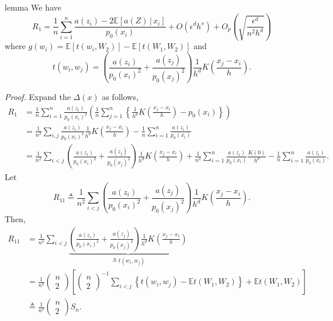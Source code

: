 \documentclass[11pt]{article}
\begin{document}
\begin{restatable}{lemma}{} \label{lemma: remainder term}
    We have
    \[R_1 = \frac{1}{n}\sum_{i = 1}^n \frac{a(z_i) - 2\mathbb{E}[a(Z)\,|\,x_i]}{p_0(x_i)} + O(\epsilon^dh^s) + O_p\left( \sqrt{\frac{\epsilon^d}{n^2h^d}}\right) \]
    where $g(w_i) = \mathbb{E}[t(w_i, W_2)] - \mathbb{E}[t(W_1, W_2)]$ and 
    \[t(w_i, w_j) = \left(\frac{a(z_i)}{p_0(x_i)^2} + \frac{a(z_j)}{p_0(x_j)^2}\right)\frac{1}{h^d}K\left(\frac{x_j - x_i}{h}\right).\]
\end{restatable}
\noindent \textit{Proof.} Expand the $\Delta(x)$ as follows,
\begin{align*}
    R_1&= \frac{1}{n}\sum_{i = 1}^n \frac{a(z_i)}{p_0(x_i)^2}\left(\frac{1}{n}\sum_{j = 1}^n\left\{\frac{1}{h^d}K\left(\frac{x_j - x_i}{h}\right) - p_0(x_i)\right\}\right) \\
    &= \frac{1}{n^2}\sum_{i, j} \frac{a(z_i)}{p_0(x_i)^2} \frac{1}{h^d}K\left(\frac{x_j - x_i}{h}\right) - \frac{1}{n}\sum_{i = 1}^n \frac{a(z_i)}{p_0(x_i)} \\
    &= \frac{1}{n^2} \sum_{i < j} \left(\frac{a(z_i)}{p_0(x_i)^2} + \frac{a(z_j)}{p_0(x_j)^2}\right)\frac{1}{h^d}K\left(\frac{x_j - x_i}{h}\right) + \frac{1}{n^2}\sum_{i = 1}^n\frac{a(z_i)}{p_0(x_i)}\frac{K(0)}{h^d} - \frac{1}{n}\sum_{i = 1}^n \frac{a(z_i)}{p_0(x_i)}.
\end{align*}
Let 
\[R_{11} \triangleq \frac{1}{n^2} \sum_{i < j} \left(\frac{a(z_i)}{p_0(x_i)^2} + \frac{a(z_j)}{p_0(x_j)^2}\right)\frac{1}{h^d}K\left(\frac{x_j - x_i}{h}\right).\]
Then, 
\begin{align*}
    R_{11} &= \frac{1}{n^2} \sum_{i < j} \underbrace{\left(\frac{a(z_i)}{p_0(x_i)^2} + \frac{a(z_j)}{p_0(x_j)^2}\right)\frac{1}{h^d}K\left(\frac{x_j - x_i}{h}\right)}_{\triangleq t(w_i, w_j)} \\
    &= \frac{1}{n^2} \begin{pmatrix}
        n \\
        2
    \end{pmatrix} \left[\begin{pmatrix}
        n \\2
    \end{pmatrix}^{-1}\sum_{i < j}\left\{t(w_i, w_j) - \mathbb{E} t(W_1, W_2)\right\} + \mathbb{E}t(W_1 , W_2 )\right] \\
    &\triangleq \frac{1}{n^2}\begin{pmatrix}
        n \\
        2
    \end{pmatrix} S_n. 
\end{align*}
\end{document}
